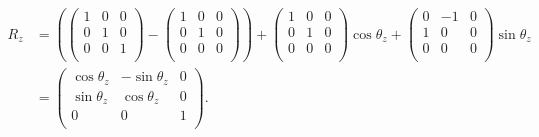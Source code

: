 \begin{equation}
\begin{split}
R_z &= 
(\begin{pmatrix}
1 & 0 & 0 \\
0 & 1 & 0 \\
0 & 0 & 1 \\
\end{pmatrix}
-
\begin{pmatrix}
1 & 0 & 0 \\
0 & 1 & 0 \\
0 & 0 & 0 \\
\end{pmatrix})
+
\begin{pmatrix}
1 & 0 & 0 \\
0 & 1 & 0 \\
0 & 0 & 0 \\
\end{pmatrix}
\cos\theta_z
+
\begin{pmatrix}
0 & -1 & 0 \\
1 & 0 & 0 \\
0 & 0 & 0 \\
\end{pmatrix}
\sin\theta_z
\\ &=
\begin{pmatrix}
\cos\theta_z & -\sin\theta_z & 0 \\
\sin\theta_z & \cos\theta_z & 0 \\
0 & 0 & 1 \\
\end{pmatrix}.
\end{split}
\end{equation}

